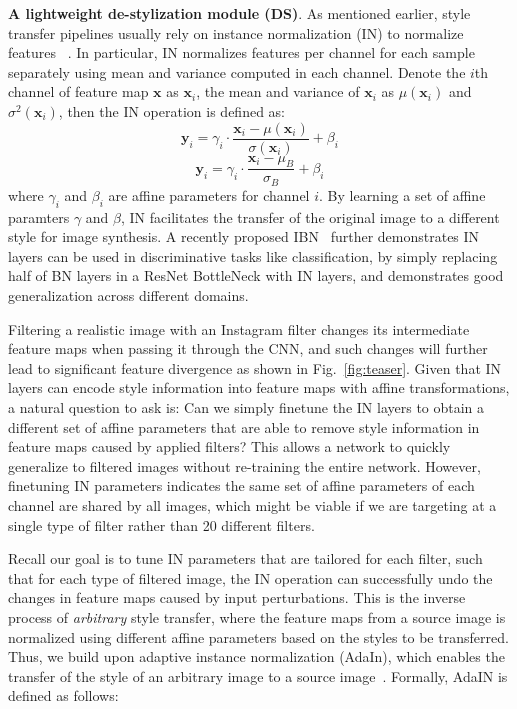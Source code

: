 \documentclass[letterpaper]{article} %
\newcommand{\xx}{{\bm x}}
\newcommand{\yy}{{\bm y}}
\begin{document}
\textbf{A lightweight de-stylization module (DS)}. As mentioned earlier, style transfer pipelines usually rely on instance normalization (IN) to normalize features ~\cite{ulyanov2016instance,huang2017adain}. In particular, IN normalizes features per channel for each sample separately using mean and variance computed in each channel. Denote the $i$th channel of feature map $\xx$ as $\xx_i$, the mean and variance of $\xx_i$ as $\mu(\xx_i)$ and $\sigma^2(\xx_i)$, then the {IN} operation is defined as:
\begin{equation}
\yy_i = \gamma_i\cdot\frac{\xx_i-\mu(\xx_i)}{\sigma(\xx_i)}+\beta_i
\end{equation}
\begin{equation}
\yy_i = \gamma_i\cdot\frac{\xx_i-\mu_B}{\sigma_B}+\beta_i
\end{equation}
where $\gamma_i$ and $\beta_i$ are affine parameters for channel $i$. By learning a set of affine paramters $\gamma$ and $\beta$, IN facilitates the transfer of the original image to a different style for image synthesis. A recently proposed IBN~\cite{pan2018two} further demonstrates IN layers can be used in discriminative tasks like classification, by simply replacing half of BN layers in a ResNet BottleNeck with IN layers, and demonstrates good generalization across different domains.


Filtering a realistic image with an Instagram filter changes its intermediate feature maps when passing it through the CNN, and such changes will further lead to significant feature divergence as shown in Fig.~\ref{fig:teaser}. Given that IN layers can encode style information into feature maps with affine transformations, a natural question to ask is: Can we simply finetune the IN layers to obtain a different set of affine parameters that are able to remove style information in feature maps caused by applied filters? This allows a network to quickly generalize to filtered images without re-training the entire network. However, finetuning IN parameters indicates the same set of affine parameters of each channel are shared by all images, which might be viable if we are targeting at a single type of filter rather than 20 different filters.

Recall our goal is to tune IN parameters that are tailored for each filter, such that for each type of filtered image, the IN operation can successfully undo the changes in feature maps caused by input perturbations. This is the inverse process of \emph{arbitrary} style transfer, where the feature maps from a source image is normalized using different affine parameters based on the styles to be transferred. Thus, we build upon adaptive instance normalization (AdaIn), which enables the transfer of the style of an arbitrary image to a source image~\cite{huang2017adain}. Formally, \textrm{AdaIN} is defined as follows:
\end{document}
